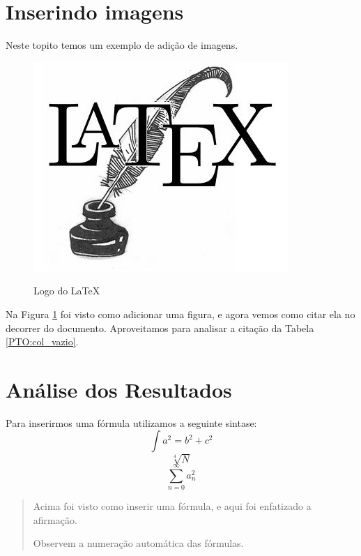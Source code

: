 \documentclass[a4paper, 12pt]{article}
\begin{document}
\section{Inserindo imagens}
Neste topito temos um exemplo de adição de imagens.

\begin{figure}[!h]
\centering
\includegraphics[scale=0.5]{latex_logo.png}
\caption{Logo do LaTeX} \cite{lamport1994latex} %
\label{fig:Logo_latex}
\end{figure}

Na Figura \ref{fig:Logo_latex} foi visto como adicionar uma figura, e agora vemos como citar ela no decorrer do documento. Aproveitamos para analisar a citação da Tabela \ref{PTO:col_vazio}.

\section{Análise dos Resultados}

Para inserirmos uma fórmula utilizamos a seguinte sintase:
\begin{equation}
\int a^{2}=b^{2}+c^{2}
\label{EQ:pitagoras}
\end{equation}
\begin{equation}
\sqrt[4]{N}
\end{equation}
\begin{equation}
\sum_{n=0}^{\infty} a_{n}^{2}
\end{equation}

\begin{quote}
Acima foi visto como inserir uma fórmula, e aqui foi enfatizado a afirmação.\par Observem a numeração automática das fórmulas.
\end{quote}
\end{document}
